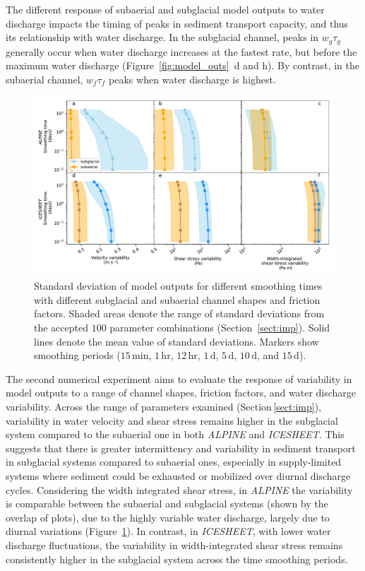 \documentclass[draft]{agujournal2019}
\newcommand{\alpine}{\textit{ALPINE}}
\newcommand{\icesheet}{\textit{ICESHEET}}
\newcommand{\unit}[1]{$\mathrm{#1}$}
\begin{document}
The different response of subaerial and subglacial model outputs to water discharge impacts the timing of peaks in sediment transport capacity, and thus its  relationship with water discharge.
In the subglacial channel, peaks in $w_g\tau_g$ generally occur when water discharge increases at the fastest rate, but before the maximum water discharge (Figure~\ref{fig:model_outs}\, d and h).
By contrast, in the subaerial channel,   $w_f\tau_f$  peaks when water discharge is highest.

\begin{figure}[h]
  \centering
  \includegraphics[width=0.9\linewidth]{Fig4.pdf}
  \caption{Standard deviation of model outputs for different smoothing times with different subglacial and subaerial channel shapes and friction factors.
    Shaded areas denote the range of standard deviations from the accepted $100$ parameter combinations (Section~\ref{sect:imp}).
    Solid lines denote  the mean value of standard deviations.
    Markers show smoothing periods ($15$\,\unit{min}, $1$\,\unit{hr}, $12$\,\unit{hr}, $1$\,\unit{d}, $5$\,\unit{d}, $10$\,\unit{d}, and $15$\,\unit{d}).
  }
  \label{fig:multi_run}
\end{figure}

The second numerical experiment aims to evaluate the response of variability in model outputs to a range of channel shapes, friction factors, and water discharge variability.
Across the range of parameters  examined (Section\,\ref{sect:imp}), variability in water velocity and shear stress remains higher in the subglacial system compared to the subaerial one in both \alpine{} and \icesheet{}.
This suggests that there is greater intermittency and variability in sediment transport in subglacial systems compared to subaerial ones, especially in supply-limited systems where sediment could be exhausted or mobilized over diurnal discharge cycles.
Considering the width integrated shear stress, in \alpine{} the variability is comparable between the subaerial and subglacial systems (shown by the overlap of plots), due to the highly variable water discharge, largely due to diurnal variations (Figure~\ref{fig:multi_run}).
In contrast, in \icesheet{}, with lower water discharge fluctuations, the variability in width-integrated shear stress remains consistently higher in the subglacial system across the time smoothing periods.
\end{document}

